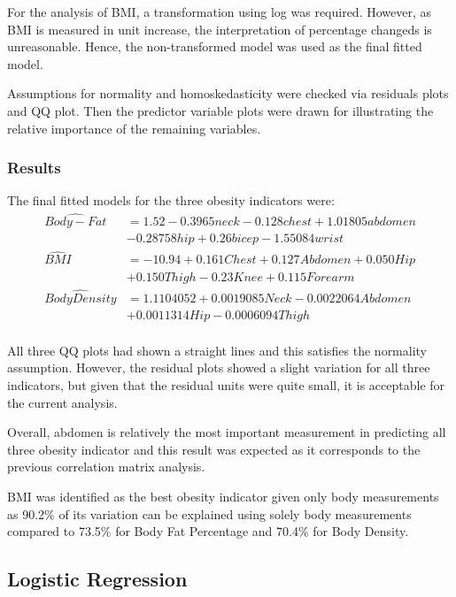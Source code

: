 \documentclass[a4paper,9pt,twocolumn,twoside,]{pinp}
\begin{document}
For the analysis of BMI, a transformation using log was required.
However, as BMI is measured in unit increase, the interpretation of
percentage changeds is unreasonable. Hence, the non-transformed model
was used as the final fitted model.

Assumptions for normality and homoskedasticity were checked via
residuals plots and QQ plot. Then the predictor variable plots were
drawn for illustrating the relative importance of the remaining
variables.

\hypertarget{results}{%
\subsubsection{Results}\label{results}}

The final fitted models for the three obesity indicators were: \[ 
\begin{aligned}
\hat{Body-Fat} &= 1.52 -0.3965neck - 0.128chest + 1.01805abdomen\\
&-0.28758hip + 0.26bicep -1.55084wrist\\
\hat{BMI} &= -10.94 +0.161Chest + 0.127Abdomen + 0.050Hip\\
&+ 0.150Thigh - 0.23Knee + 0.115Forearm\\
\hat{Body Density} &= 1.1104052 + 0.0019085 Neck- 0.0022064Abdomen\\
&+ 0.0011314 Hip - 0.0006094 Thigh\\
\end{aligned}
\]

All three QQ plots had shown a straight lines and this satisfies the
normality assumption. However, the residual plots showed a slight
variation for all three indicators, but given that the residual units
were quite small, it is acceptable for the current analysis.

Overall, abdomen is relatively the most important measurement in
predicting all three obesity indicator and this result was expected as
it corresponds to the previous correlation matrix analysis.

BMI was identified as the best obesity indicator given only body
measurements as 90.2\% of its variation can be explained using solely
body measurements compared to 73.5\% for Body Fat Percentage and 70.4\%
for Body Density.

\hypertarget{logistic-regression}{%
\subsection{Logistic Regression}\label{logistic-regression}}
\end{document}
